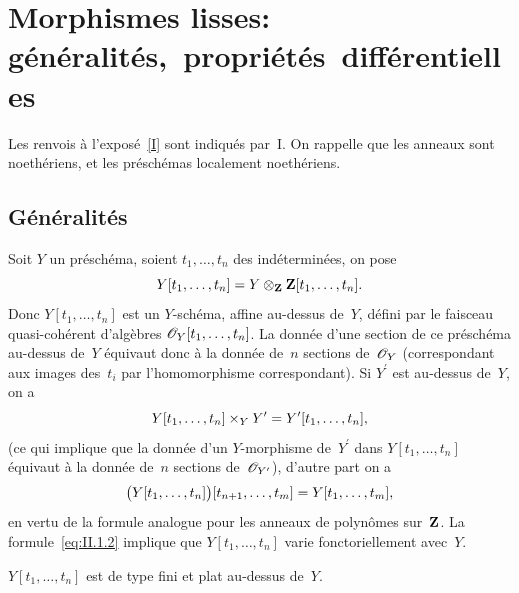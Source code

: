 \chapter{Morphismes lisses: g\'en\'eralit\'es,~propri\'et\'es~diff\'erentielles}
\label{II}
Les renvois \`a l'expos\'e~\ref{I} sont indiqu\'es par~I. On
rappelle que les anneaux sont noeth\'eriens, et les
pr\'esch\'emas localement noeth\'eriens.

\section{G\'en\'eralit\'es}
\label{II.1}

Soit $Y$ un pr\'esch\'ema, soient $t_1,\dots,t_n$ des
ind\'etermin\'ees, on pose
\begin{equation}
\label{eq:II.1.1}
Y[t_1,\dots,t_n]=Y\otimes_{\mathbf{Z}} \mathbf{Z}[t_1,\dots,t_n].
\end{equation}
Donc $Y[t_1,\dots,t_n]$ est un $Y$-sch\'ema, affine au-dessus
de~$Y$, d\'efini par le faisceau quasi-coh\'erent d'alg\`ebres
$\cal{O}_Y[t_1,\dots,t_n]$. La donn\'ee d'une section de ce
pr\'esch\'ema au-dessus de~$Y$ \'equivaut donc \`a la
donn\'ee de~$n$ sections de~$\cal{O}_Y$ (correspondant aux images
des~$t_i$ par l'homomorphisme correspondant). Si $Y^\prime$ est
au-dessus de~$Y$, on a
\begin{equation}
\label{eq:II.1.2}
Y[t_1,\dots,t_n]\times_Y Y'=Y'[t_1,\dots,t_n],
\end{equation}
(ce qui implique que la donn\'ee d'un $Y$-morphisme de~$Y^\prime$
dans $Y[t_1,\dots,t_n]$ \'equivaut \`a la donn\'ee de~$n$
sections de~$\cal{O}_{Y^\prime}$), d'autre part on a
\begin{equation}
\label{eq:II.1.3}
\big(Y[t_1,\dots,t_n]\big)[t_{n+1},\dots,t_m]=Y[t_1,\dots,t_m],
\end{equation}
en vertu de la formule analogue pour les anneaux de polyn\^omes
sur~$\mathbf{Z}$. La formule~\eqref{eq:II.1.2} implique que
$Y[t_1,\dots,t_n]$ varie fonctoriellement avec~$Y$.

$Y[t_1,\dots,t_n]$ est de type fini et plat au-dessus de~$Y$.

